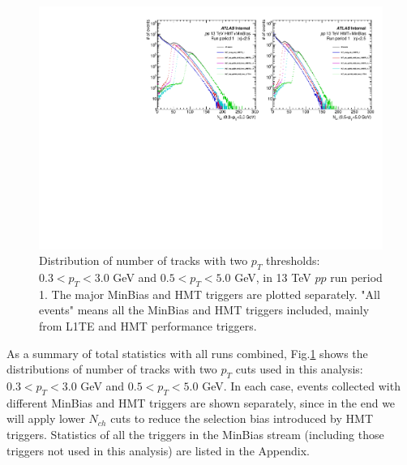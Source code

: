 \begin{figure}[H]
\centering
\includegraphics[width=.9\linewidth]{figs/sec_evtSlc/trkDis_pp13_run1.pdf}
\caption{Distribution of number of tracks with two $p_{T}$ thresholds: $0.3<p_{T}<3.0$ GeV and $0.5<p_{T}<5.0$ GeV, in 13 TeV $pp$ run period 1. The major MinBias and HMT triggers are plotted separately. "All events" means all the MinBias and HMT triggers included, mainly from L1TE and HMT performance triggers.}
\label{fig:trkDis_pp13_run1}
\end{figure}

As a summary of total statistics with all runs combined, Fig.\ref{fig:trkDis_pp13_run1} shows the distributions of number of tracks with two $p_{T}$ cuts used in this analysis: $0.3<p_{T}<3.0$ GeV and $0.5<p_{T}<5.0$ GeV. In each case, events collected with different MinBias and HMT triggers are shown separately, since in the end we will apply lower $N_{ch}$ cuts to reduce the selection bias introduced by HMT triggers. Statistics of all the triggers in the MinBias stream (including those triggers not used in this analysis) are listed in the Appendix.

